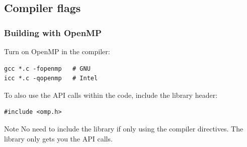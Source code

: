 \documentclass[aspectratio=169]{beamer}
\begin{document}
\subsection{Compiler flags}
\begin{frame}[fragile]
\frametitle{Building with OpenMP}

Turn on OpenMP in the compiler:
\begin{verbatim}
gcc *.c -fopenmp   # GNU
icc *.c -qopenmp   # Intel
\end{verbatim}

To also use the API calls within the code, include the library header:
\begin{verbatim}
#include <omp.h>
\end{verbatim}

\begin{alertblock}{Note}
No need to include the library if only using the compiler directives.
The library only gets you the API calls.
\end{alertblock}
\end{frame}

\end{document}
